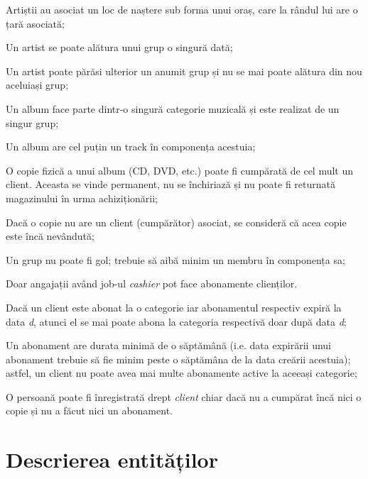 \documentclass[a4paper, oneside, 12pt]{article}
\begin{document}
\begin{m_itemize}
        \item Artiștii au asociat un loc de naștere sub forma unui oraș, care
              la rândul lui are o țară asociată;
        \item Un artist se poate alătura unui grup o singură dată;
        \item Un artist poate părăsi ulterior un anumit grup și nu se mai poate
              alătura din nou aceluiași grup;
        \item Un album face parte dintr-o singură categorie muzicală și este
              realizat de un singur grup;
        \item Un album are cel puțin un track în componența acestuia;
        \item O copie fizică a unui album (CD, DVD, etc.) poate fi cumpărată de
              cel mult un client. Aceasta se vinde permanent, nu se
              închiriază și nu poate fi returnată magazinului în urma
              achiziționării;
        \item Dacă o copie nu are un client (cumpărător) asociat, se consideră
              că acea copie este încă nevândută;
        \item Un grup nu poate fi gol; trebuie să aibă minim un membru în
              componența sa;
        \item Doar angajații având job-ul \emph{cashier} pot face abonamente
              clienților.
        \item Dacă un client este abonat la o categorie iar abonamentul
              respectiv expiră la data \emph{d}, atunci el se mai poate abona
              la categoria respectivă doar după data \emph{d};
        \item Un abonament are durata minimă de o săptămână (i.e. data
              expirării unui abonament trebuie să fie minim peste o săptămâna
              de la data creării acestuia); astfel, un client nu poate avea
              mai multe abonamente active la aceeași categorie;
        \item O persoană poate fi înregistrată drept \emph{client} chiar dacă nu
              a cumpărat încă nici o copie și nu a făcut nici un abonament.

\end{m_itemize}

\section{Descrierea entităților}
\end{document}
